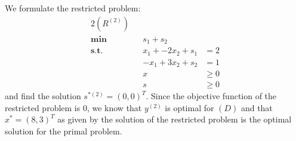 \documentclass[a4paper,12pt,headsepline]{scrartcl}
\begin{document}
We formulate the restricted problem:
\begin{alignat*}{2}
	(R^{(2)}) \\
	\textbf{min}\quad  && s_1 + s_2 \\
	\textbf{s.t.}\quad && x_1 + -2x_2 + s_1 &= 2 \\
										 && -x_1 + 3x_2 + s_2 &= 1 \\
										 && x &\ge 0 \\
								     && s &\ge 0
\end{alignat*}
and find the solution $s^{*(2)} = (0,0)^T$.
Since the objective function of the restricted problem is 0, we know that $y^{(2)}$ is optimal for $(D)$ and that $x^* = (8,3)^T$ as given by the solution of the restricted problem is the optimal solution for the primal problem.
\end{document}
